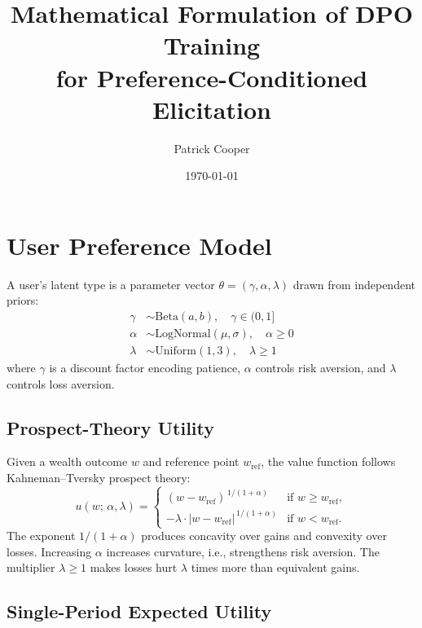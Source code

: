 \documentclass[11pt]{article}
\title{Mathematical Formulation of DPO Training\\for Preference-Conditioned Elicitation}
\author{Patrick Cooper}
\date{\today}
\begin{document}
\maketitle

\section{User Preference Model}

A user's latent type is a parameter vector
$\theta = (\gamma, \alpha, \lambda)$ drawn from independent priors:
\begin{align}
  \gamma &\sim \mathrm{Beta}(a, b), \quad \gamma \in (0,1] \label{eq:gamma} \\
  \alpha &\sim \mathrm{LogNormal}(\mu, \sigma), \quad \alpha \ge 0 \label{eq:alpha} \\
  \lambda &\sim \mathrm{Uniform}(1, 3), \quad \lambda \ge 1 \label{eq:lambda}
\end{align}
where $\gamma$ is a discount factor encoding patience, $\alpha$ controls risk
aversion, and $\lambda$ controls loss aversion.

\subsection{Prospect-Theory Utility}

Given a wealth outcome $w$ and reference point $w_{\mathrm{ref}}$, the
value function follows Kahneman--Tversky prospect theory:
\begin{equation}\label{eq:prospect}
  u(w;\, \alpha, \lambda) =
  \begin{cases}
    (w - w_{\mathrm{ref}})^{\,1/(1+\alpha)}
      & \text{if } w \ge w_{\mathrm{ref}}, \\[4pt]
    -\lambda \cdot |w - w_{\mathrm{ref}}|^{\,1/(1+\alpha)}
      & \text{if } w < w_{\mathrm{ref}}.
  \end{cases}
\end{equation}
The exponent $1/(1+\alpha)$ produces concavity over gains and convexity over
losses. Increasing $\alpha$ increases curvature, i.e., strengthens risk
aversion. The multiplier $\lambda \ge 1$ makes losses hurt $\lambda$ times
more than equivalent gains.

\subsection{Single-Period Expected Utility}
\end{document}

